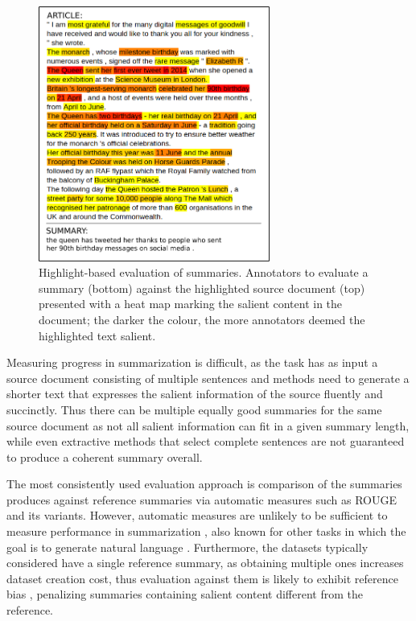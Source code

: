 \documentclass[11pt,a4paper]{article}
\begin{document}
\begin{figure}[t!]
    \centering
    \includegraphics[width=7.6cm]{heatmap_summ}
    \caption{Highlight-based evaluation of summaries. Annotators to evaluate a summary (bottom) against the highlighted source document (top) presented with a heat map marking the salient content in the document; the darker the colour, the more annotators deemed the highlighted text salient. %
    }
  \label{image:heatmap}
\end{figure}

Measuring progress in summarization is difficult, as the task has as input a source document consisting of multiple sentences and methods need to generate a shorter text that expresses the salient information of the source fluently and succinctly. Thus there can be multiple equally good summaries for the same source document as not all salient information can fit in a given summary length, while even extractive methods that select complete sentences are not guaranteed to produce a coherent summary overall.

The most consistently used evaluation approach is comparison of the summaries produces against reference summaries via 
automatic measures such as ROUGE \citep{Lin2004} and its variants. However, automatic measures are unlikely to be sufficient to measure performance in summarization \citep{schluter:2017:EACLshort}, also known for other tasks in which the goal is to generate natural language \citep{novikova2017we}. Furthermore, the datasets typically considered have a single reference summary, as obtaining multiple ones increases dataset creation cost, thus evaluation against them is likely to exhibit reference bias \citep{Louis2013,fomicheva2016reference}, penalizing summaries containing salient content different from the reference. 
\end{document}

